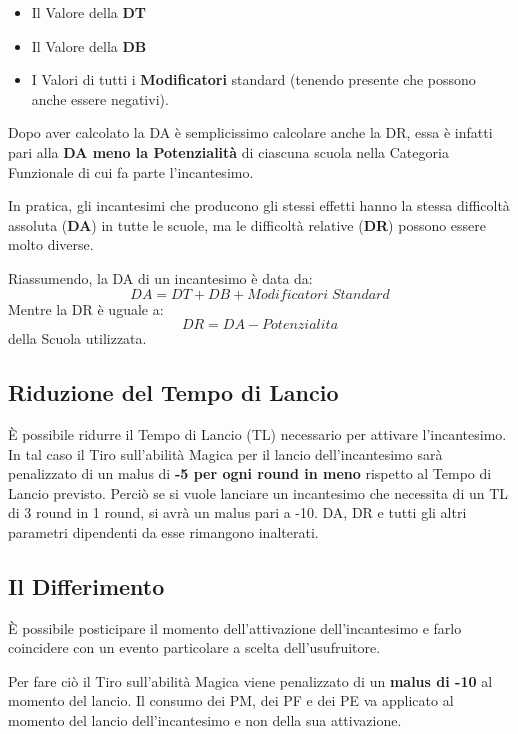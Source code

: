 \begin{itemize}\itemsep -6pt
\item Il Valore della \textbf{DT}
\item Il Valore della \textbf{DB}
\item I Valori di tutti i \textbf{Modificatori} standard (tenendo
  presente che possono anche essere negativi).
\end{itemize}

Dopo aver calcolato la DA \`e semplicissimo calcolare anche la DR,
essa \`e infatti pari alla \textbf{DA meno la Potenzialit\`a} di
ciascuna scuola nella Categoria Funzionale di cui fa parte
l'incantesimo.

In pratica, gli incantesimi che producono gli stessi effetti hanno la
stessa difficolt\`a assoluta (\textbf{DA}) in tutte le scuole, ma le
difficolt\`a relative (\textbf{DR}) possono essere molto diverse.

Riassumendo, la DA
di un incantesimo \`e data da: 
$$DA = DT + DB + Modificatori\;Standard$$ 
Mentre la DR \`e uguale a: 
$$DR = DA - Potenzialita$$
della Scuola utilizzata.

\iffullversion
{\raggedright \subsection{Riduzione del Tempo di Lancio}}

\`E possibile ridurre il Tempo di Lancio (TL) necessario per attivare
l'incantesimo. In tal caso il Tiro sull'abilit\`a Magica per il
lancio dell'incantesimo sar\`a penalizzato di un malus di \textbf{-5
  per ogni round in meno} rispetto al Tempo di Lancio previsto.
Perci\`o se si vuole lanciare un incantesimo che necessita di un TL
di 3 round in 1 round, si avr\`a un malus pari a -10. DA, DR e tutti
gli altri parametri dipendenti da esse rimangono inalterati.
\fi

\subsection{Il Differimento} \`E
possibile posticipare il momento dell'attivazione dell'incantesimo e
farlo coincidere con un evento particolare a scelta dell'usufruitore.

Per fare ci\`o il Tiro sull'abilit\`a Magica viene penalizzato di
un \textbf{malus di -10} al momento del lancio. Il consumo dei PM, dei
PF e dei PE va applicato al momento del lancio dell'incantesimo e non
della sua attivazione.

